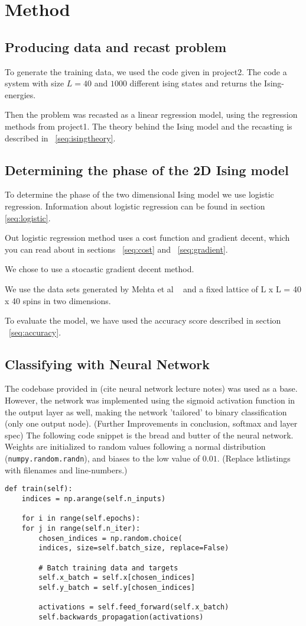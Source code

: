 \section{Method}

\subsection{Producing data and recast problem}
To generate the training data, we used the code given in 
project2. 
The code a system with size \(L=40\) and \(1000\) different 
ising states and returns the Ising-energies. 

Then the problem was recasted as a linear regression model, using 
the regression methods from project1. The theory behind 
the Ising model and the recasting is described in ~\ref{seq:isingtheory}.

\subsection{Determining the phase of the 2D Ising model}
To determine the phase of the two dimensional Ising model we use 
logistic regression. Information about logistic regression can be found 
in section \ref{seq:logistic}. 

Out logistic regression method uses a cost function 
and gradient decent, which you can read about 
in sections ~\ref{seq:cost} and ~\ref{seq:gradient}.

We chose to use a stocastic gradient decent method. 

We use the data sets generated by Mehta et al ~\cite{HighBias}
and a fixed lattice of L x L = 40 x 40 spins in two dimensions.

To evaluate the model, we have used the accuracy score described in 
section ~\ref{seq:accuracy}. 

\subsection{Classifying with Neural Network}
The codebase provided in (cite neural network lecture notes) was
used as a base. However, the network was implemented using the sigmoid
activation function in the output layer as well, making the network
'tailored' to binary classification (only one output node). 
(Further Improvements in conclusion, softmax and layer spec)
The following code snippet is the bread and butter of the neural
network. Weights are initialized to random values following a
normal distribution (\lstinline{numpy.random.randn}), and biases
to the low value of $0.01$.
(Replace lstlistings with filenames and line-numbers.)
\begin{lstlisting}
def train(self):
    indices = np.arange(self.n_inputs)

    for i in range(self.epochs):
	for j in range(self.n_iter):
	    chosen_indices = np.random.choice(
		indices, size=self.batch_size, replace=False)

	    # Batch training data and targets
	    self.x_batch = self.x[chosen_indices]
	    self.y_batch = self.y[chosen_indices]

	    activations = self.feed_forward(self.x_batch)
	    self.backwards_propagation(activations)
\end{lstlisting}
